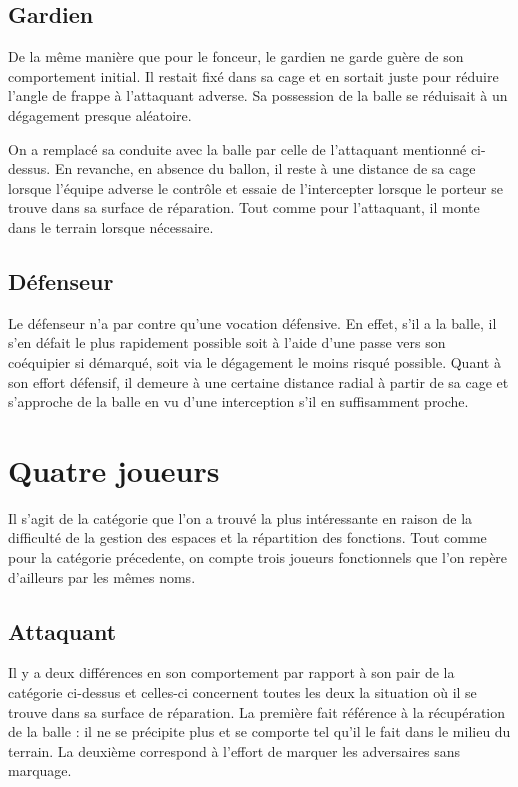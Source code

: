 \documentclass[12pt,a4paper]{article}
\begin{document}
\subsection*{Gardien}
De la m\^eme mani\`ere que pour le fonceur, le gardien ne garde gu\`ere de son 
comportement initial. Il restait fix\'e dans sa cage et en sortait juste pour 
r\'eduire l'angle de frappe \`a l'attaquant adverse. Sa possession de la balle 
se r\'eduisait \`a un d\'egagement presque al\'eatoire.

On a remplac\'e sa conduite avec la balle par celle de l'attaquant 
mentionn\'e ci-dessus. En revanche, en absence du ballon, il reste \`a une 
distance de sa cage lorsque l'\'equipe adverse le contr\^ole et essaie 
de l'intercepter lorsque le porteur se trouve dans sa surface de r\'eparation. 
Tout comme pour l'attaquant, il monte dans le terrain lorsque n\'ecessaire.

\subsection*{D\'efenseur}
Le d\'efenseur n'a par contre qu'une vocation d\'efensive. En effet, s'il a la 
balle, il s'en d\'efait le plus rapidement possible soit \`a l'aide d'une passe 
vers son co\'equipier si d\'emarqu\'e, soit via le d\'egagement le moins 
risqu\'e possible. Quant \`a son effort d\'efensif, il demeure \`a une certaine 
distance radial \`a partir de sa cage et s'approche de la balle en vu d'une 
interception s'il en suffisamment proche.

\section{Quatre joueurs}
Il s'agit de la cat\'egorie que l'on a trouv\'e la plus int\'eressante en 
raison de la difficult\'e de la gestion des espaces et la r\'epartition des 
fonctions. Tout comme pour la cat\'egorie pr\'ecedente, on compte trois 
joueurs fonctionnels que l'on rep\`ere d'ailleurs par les m\^emes noms. 

\subsection*{Attaquant}
Il y a deux diff\'erences en son comportement par rapport \`a son pair 
de la cat\'egorie ci-dessus et celles-ci concernent toutes les deux la 
situation o\`u il se trouve dans sa surface de r\'eparation. La premi\`ere fait 
r\'ef\'erence \`a la r\'ecup\'eration de la balle : il ne se 
pr\'ecipite plus et se comporte tel qu'il le fait dans le milieu du terrain. La 
deuxi\`eme correspond \`a l'effort de marquer les adversaires sans 
marquage.
\end{document}

